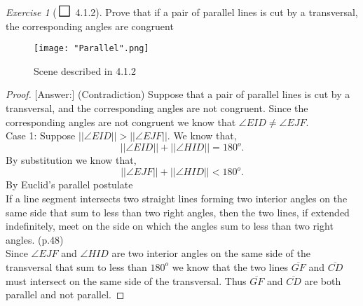 \documentclass[12pt]{amsart}
\def\msquare{\mathord{\scalerel*{\Box}{gX}}}
\theoremstyle{remark}
\newtheorem*{exercise}{Exercise}%
\theoremstyle{mycomment}
\newcommand{\bproof}{\begin{proof}\setstretch{1.5}}
\newcommand{\eproof}{\end{proof}\singlespacing}
\begin{document}
\begin{exercise}[$ \msquare$ 4.1.2] Prove that if a pair of parallel lines is cut by a transversal, the corresponding angles are congruent\\
\begin{figure}[H]
\caption{Scene described in 4.1.2}
\centering
\texttt{[image: "Parallel".png]}
\end{figure}
\bproof[Answer:] (Contradiction)
Suppose that a pair of parallel lines is cut by a transversal, and the corresponding angles are not congruent. Since the corresponding angles are not congruent we know that $\angle EID \neq \angle EJF$.\\

Case 1: Suppose $||\angle EID|| > ||\angle EJF||$. We know that,
\begin{equation*}
||\angle EID || + || \angle HID ||  = 180^o.
\end{equation*}
By substitution we know that,
\begin{equation*}
||\angle EJF || + || \angle HID ||  < 180^o.
\end{equation*}
By Euclid's parallel postulate\\

If a line segment intersects two straight lines forming two interior angles on the same side that sum to less than two right angles, then the two lines, if extended indefinitely, meet on the side on which the angles sum to less than two right angles. (p.48)\\

Since $\angle EJF$ and $\angle HID$ are two interior angles on the same side of the transversal that sum to less than $180^o$ we know that the two lines $\overline{GF}$ and $\overline{CD}$ must intersect on the same side of the transversal. Thus $\overline{GF}$ and $\overline{CD}$ are both parallel and not parallel.

\eproof
\end{exercise}
\end{document}
